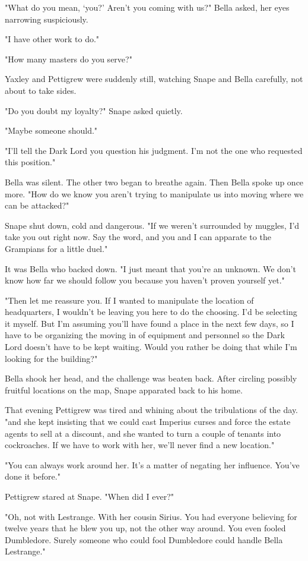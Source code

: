 "What do you mean, `you?' Aren't you coming with us?" Bella asked, her eyes narrowing suspiciously.

"I have other work to do."

"How many masters do you serve?"

Yaxley and Pettigrew were suddenly still, watching Snape and Bella carefully, not about to take sides.

"Do you doubt my loyalty?" Snape asked quietly.

"Maybe someone should."

"I'll tell the Dark Lord you question his judgment. I'm not the one who requested this position."

Bella was silent. The other two began to breathe again. Then Bella spoke up once more. "How do we know you aren't trying to manipulate us into moving where we can be attacked?"

Snape shut down, cold and dangerous. "If we weren't surrounded by muggles, I'd take you out right now. Say the word, and you and I can apparate to the Grampians for a little duel."

It was Bella who backed down. "I just meant that you're an unknown. We don't know how far we should follow you because you haven't proven yourself yet."

"Then let me reassure you. If I wanted to manipulate the location of headquarters, I wouldn't be leaving you here to do the choosing. I'd be selecting it myself. But I'm assuming you'll have found a place in the next few days, so I have to be organizing the moving in of equipment and personnel so the Dark Lord doesn't have to be kept waiting. Would you rather be doing that while I'm looking for the building?"

Bella shook her head, and the challenge was beaten back. After circling possibly fruitful locations on the map, Snape apparated back to his home.

That evening Pettigrew was tired and whining about the tribulations of the day. "{\el}and she kept insisting that we could cast Imperius curses and force the estate agents to sell at a discount, and she wanted to turn a couple of tenants into cockroaches. If we have to work with her, we'll never find a new location."

"You can always work around her. It's a matter of negating her influence. You've done it before."

Pettigrew stared at Snape. "When did I ever{\el}?"

"Oh, not with Lestrange. With her cousin Sirius. You had everyone believing for twelve years that he blew you up, not the other way around. You even fooled Dumbledore. Surely someone who could fool Dumbledore could handle Bella Lestrange."

